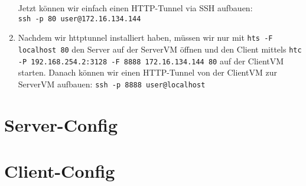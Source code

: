 \documentclass[a4paper,10pt]{scrartcl}
\begin{document}
\begin{enumerate}[\bfseries 1.]
			Jetzt können wir einfach einen HTTP-Tunnel via SSH aufbauen:\\
			\texttt{ssh -p 80 user@172.16.134.144}
			\item Nachdem wir httptunnel installiert haben, müssen wir nur mit
			      \texttt{hts -F localhost 80} den Server auf der ServerVM öffnen und
			      den Client mittels \texttt{htc -P 192.168.254.2:3128 -F 8888
			      172.16.134.144 80} auf der ClientVM starten. Danach können wir einen
			      HTTP-Tunnel von der ClientVM zur ServerVM aufbauen:
			      \texttt{ssh -p 8888 user@localhost}
		\end{enumerate}

\pagebreak

\begin{appendices}
    \section{Server-Config}
    
    \section{Client-Config}
    
\end{appendices}
\end{document}
